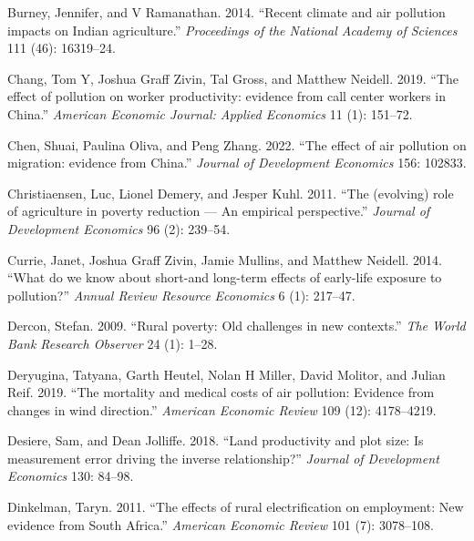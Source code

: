 \documentclass[
]{article}
\newlength{\cslhangindent}
\newlength{\cslentryspacingunit} %
\newenvironment{CSLReferences}[2] %
 {%
  \setlength{\parindent}{0pt}
  \ifodd #1
  \let\oldpar\par
  \def\par{\hangindent=\cslhangindent\oldpar}
  \fi
  \setlength{\parskip}{#2\cslentryspacingunit}
 }%
 {}
\begin{document}
\begin{CSLReferences}{1}{0}
\leavevmode{}%
Burney, Jennifer, and V Ramanathan. 2014. {``{Recent climate and air pollution impacts on Indian agriculture}.''} \emph{{Proceedings of the National Academy of Sciences}} 111 (46): 16319--24.

\leavevmode{}%
Chang, Tom Y, Joshua Graff Zivin, Tal Gross, and Matthew Neidell. 2019. {``{The effect of pollution on worker productivity: evidence from call center workers in China}.''} \emph{{American Economic Journal: Applied Economics}} 11 (1): 151--72.

\leavevmode{}%
Chen, Shuai, Paulina Oliva, and Peng Zhang. 2022. {``{The effect of air pollution on migration: evidence from China}.''} \emph{{Journal of Development Economics}} 156: 102833.

\leavevmode{}%
Christiaensen, Luc, Lionel Demery, and Jesper Kuhl. 2011. {``{The (evolving) role of agriculture in poverty reduction --- An empirical perspective}.''} \emph{{Journal of Development Economics}} 96 (2): 239--54.

\leavevmode{}%
Currie, Janet, Joshua Graff Zivin, Jamie Mullins, and Matthew Neidell. 2014. {``{What do we know about short-and long-term effects of early-life exposure to pollution?}''} \emph{{Annual Review Resource Economics}} 6 (1): 217--47.

\leavevmode{}%
Dercon, Stefan. 2009. {``{Rural poverty: Old challenges in new contexts}.''} \emph{{The World Bank Research Observer}} 24 (1): 1--28.

\leavevmode{}%
Deryugina, Tatyana, Garth Heutel, Nolan H Miller, David Molitor, and Julian Reif. 2019. {``{The mortality and medical costs of air pollution: Evidence from changes in wind direction}.''} \emph{{American Economic Review}} 109 (12): 4178--4219.

\leavevmode{}%
Desiere, Sam, and Dean Jolliffe. 2018. {``{Land productivity and plot size: Is measurement error driving the inverse relationship?}''} \emph{{Journal of Development Economics}} 130: 84--98.

\leavevmode{}%
Dinkelman, Taryn. 2011. {``{The effects of rural electrification on employment: New evidence from South Africa}.''} \emph{{American Economic Review}} 101 (7): 3078--108.


\end{CSLReferences}
\end{document}
